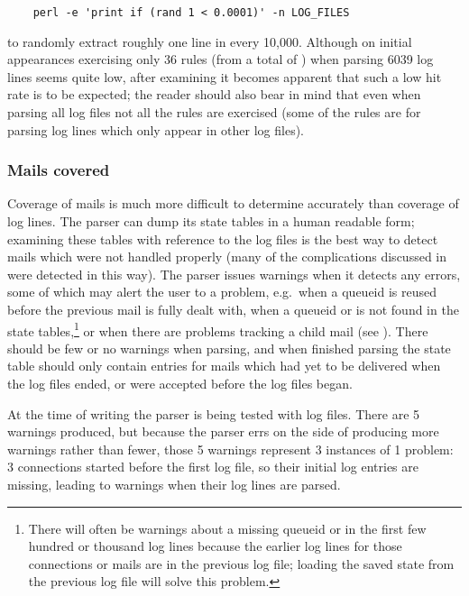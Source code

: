 \verb!    perl -e 'print if (rand 1 < 0.0001)' -n LOG_FILES!

\noindent{}to randomly extract roughly one line in every 10,000.  Although
on initial appearances exercising only 36 rules (from a total of
\numberOFrules{}) when parsing 6039 log lines seems quite low, after
examining  it becomes apparent that such
a low hit rate is to be expected; the reader should also bear in mind that
even when parsing all \numberOFlogFILES{} log files not all the rules are
exercised (some of the rules are for parsing log lines which only appear in
other log files).

\subsubsection{Mails covered}

\label{mails-covered}

Coverage of mails is much more difficult to determine accurately than
coverage of log lines.  The parser can dump its state tables in a human
readable form; examining these tables with reference to the log files is
the best way to detect mails which were not handled properly (many of the
complications discussed in  were
detected in this way).  The parser issues warnings when it detects any
errors, some of which may alert the user to a problem, e.g.\ when a queueid
is reused before the previous mail is fully dealt with, when a queueid or
\pid{} is not found in the state tables,\footnote{There will often be
warnings about a missing queueid or \pid{} in the first few hundred or
thousand log lines because the earlier log lines for those connections or
mails are in the previous log file; loading the saved state from the
previous log file will solve this problem.} or when there are problems
tracking a child mail (see ).  There
should be few or no warnings when parsing, and when finished parsing the
state table should only contain entries for mails which had yet to be
delivered when the log files ended, or were accepted before the log files
began.

At the time of writing the parser is being tested with \numberOFlogFILES{}
log files.  There are 5 warnings produced, but because the parser errs on
the side of producing more warnings rather than fewer, those 5 warnings
represent 3 instances of 1 problem: 3 connections started before the first
log file, so their initial log entries are missing, leading to warnings
when their log lines are parsed.

